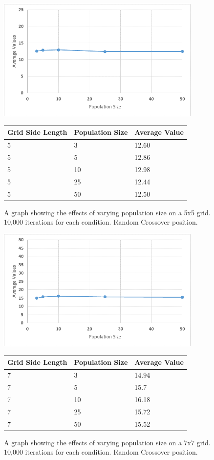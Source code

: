 \documentclass[12pt]{article}
\begin{document}
\begin{figure}[H]
    \centering
    \includegraphics[width=0.9\textwidth]{5x5_GA_pop}
\begin{tabular}{ |p{4cm}||p{4cm}|p{4cm}|  }
 \hline
Grid Side Length&Population Size&Average Value\\
 \hline
5&3&12.60\\
5&5&12.86\\
5&10&12.98\\
5&25&12.44\\
5&50&12.50\\
 \hline
\end{tabular}
    \caption{A graph showing the effects of varying population size on a 5x5 grid. 10,000 iterations for each condition. Random Crossover position.}
    \label{fig:GApop5x5}
\end{figure}

\begin{figure}[H]
    \centering
    \includegraphics[width=0.9\textwidth]{7x7_GA_pop}
\begin{tabular}{ |p{4cm}||p{4cm}|p{4cm}|  }
 \hline
Grid Side Length&Population Size&Average Value\\
 \hline
7&3&14.94\\
7&5&15.7\\
7&10&16.18\\
7&25&15.72\\
7&50&15.52\\
 \hline
\end{tabular}
    \caption{A graph showing the effects of varying population size on a 7x7 grid. 10,000 iterations for each condition. Random Crossover position.}
    \label{fig:GApop7x7}
\end{figure}
\end{document}
